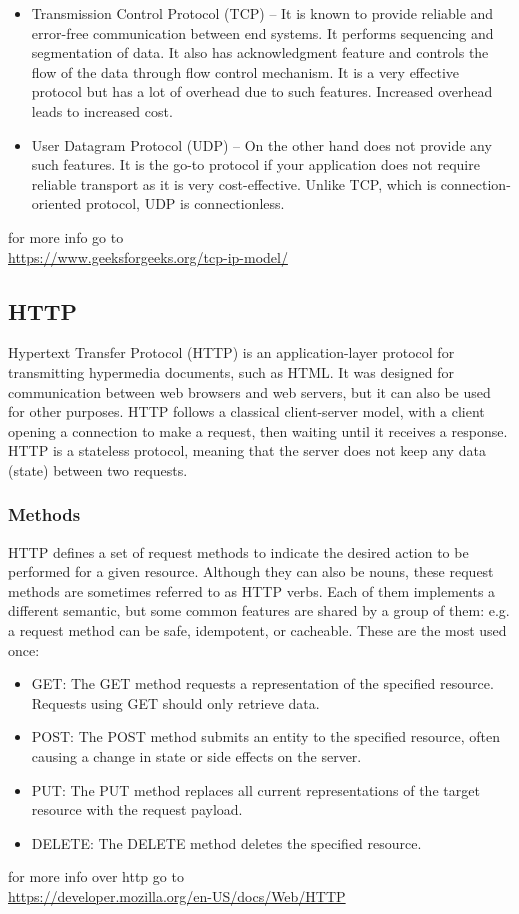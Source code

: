 \documentclass[a4paper,twoside, 12pt]{report}
\theoremstyle{break}
\begin{document}
\begin{enumerate}
\begin{itemize}
          \item Transmission Control Protocol (TCP) – It is known to provide reliable and error-free communication between end systems. It performs sequencing and segmentation of data. It also has acknowledgment feature and controls the flow of the data through flow control mechanism. It is a very effective protocol but has a lot of overhead due to such features. Increased overhead leads to increased cost.

          \item User Datagram Protocol (UDP) – On the other hand does not provide any such features. It is the go-to protocol if your application does not require reliable transport as it is very cost-effective. Unlike TCP, which is connection-oriented protocol, UDP is connectionless.
        \end{itemize}
\end{enumerate}
for more info go to\\
\url{https://www.geeksforgeeks.org/tcp-ip-model/}
\subsection{HTTP}
Hypertext Transfer Protocol (HTTP) is an application-layer protocol for transmitting hypermedia documents, such as HTML. It was designed for communication between web browsers and web servers, but it can also be used for other purposes. HTTP follows a classical client-server model, with a client opening a connection to make a request, then waiting until it receives a response. HTTP is a stateless protocol, meaning that the server does not keep any data (state) between two requests.
\subsubsection{Methods}
HTTP defines a set of request methods to indicate the desired action to be performed for a given resource. Although they can also be nouns, these request methods are sometimes referred to as HTTP verbs. Each of them implements a different semantic, but some common features are shared by a group of them: e.g. a request method can be safe, idempotent, or cacheable. These are the most used once:

\begin{itemize}
  \item GET: The GET method requests a representation of the specified resource. Requests using GET should only retrieve data.
  \item POST: The POST method submits an entity to the specified resource, often causing a change in state or side effects on the server.
  \item PUT: The PUT method replaces all current representations of the target resource with the request payload.
  \item DELETE: The DELETE method deletes the specified resource.
\end{itemize}
for more info over http go to\\
\url{https://developer.mozilla.org/en-US/docs/Web/HTTP}
\vfill
\eject
\end{document}
